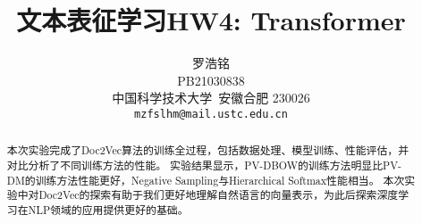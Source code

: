 \documentclass{article}
\title{文本表征学习HW4: Transformer}
\author{
  罗浩铭 \\
  PB21030838\\
  中国科学技术大学\ 安徽合肥 230026 \\
  \texttt{mzfslhm@mail.ustc.edu.cn} \\
}
\begin{document}
\maketitle


\begin{abstract}
  本次实验完成了Doc2Vec算法的训练全过程，包括数据处理、模型训练、性能评估，并对比分析了不同训练方法的性能。
  实验结果显示，PV-DBOW的训练方法明显比PV-DM的训练方法性能更好，Negative Sampling与Hierarchical Softmax性能相当。
  本次实验中对Doc2Vec的探索有助于我们更好地理解自然语言的向量表示，为此后探索深度学习在NLP领域的应用提供更好的基础。
\end{abstract}




\end{document}
